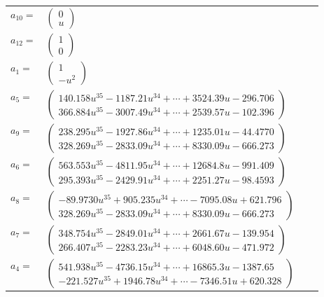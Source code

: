 \documentclass[1p]{elsarticle_modified}
\theoremstyle{definition}
\begin{document}
\begin{tabular}{m{7pt} m{180pt} m{7pt} m{180pt} }
\flushright $a_{10}=$&$\begin{pmatrix}0\\u\end{pmatrix}$ \\
\flushright $a_{12}=$&$\begin{pmatrix}1\\0\end{pmatrix}$ \\
\flushright $a_{1}=$&$\begin{pmatrix}1\\- u^2\end{pmatrix}$ \\
\flushright $a_{5}=$&$\begin{pmatrix}140.158 u^{35}-1187.21 u^{34}+\cdots+3524.39 u-296.706\\366.884 u^{35}-3007.49 u^{34}+\cdots+2539.57 u-102.396\end{pmatrix}$ \\
\flushright $a_{9}=$&$\begin{pmatrix}238.295 u^{35}-1927.86 u^{34}+\cdots+1235.01 u-44.4770\\328.269 u^{35}-2833.09 u^{34}+\cdots+8330.09 u-666.273\end{pmatrix}$ \\
\flushright $a_{6}=$&$\begin{pmatrix}563.553 u^{35}-4811.95 u^{34}+\cdots+12684.8 u-991.409\\295.393 u^{35}-2429.91 u^{34}+\cdots+2251.27 u-98.4593\end{pmatrix}$ \\
\flushright $a_{8}=$&$\begin{pmatrix}-89.9730 u^{35}+905.235 u^{34}+\cdots-7095.08 u+621.796\\328.269 u^{35}-2833.09 u^{34}+\cdots+8330.09 u-666.273\end{pmatrix}$ \\
\flushright $a_{7}=$&$\begin{pmatrix}348.754 u^{35}-2849.01 u^{34}+\cdots+2661.67 u-139.954\\266.407 u^{35}-2283.23 u^{34}+\cdots+6048.60 u-471.972\end{pmatrix}$ \\
\flushright $a_{4}=$&$\begin{pmatrix}541.938 u^{35}-4736.15 u^{34}+\cdots+16865.3 u-1387.65\\-221.527 u^{35}+1946.78 u^{34}+\cdots-7346.51 u+620.328\end{pmatrix}$ \\

\end{tabular}
\end{document}
